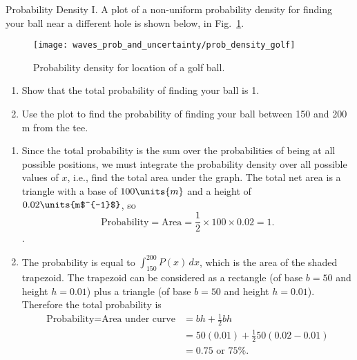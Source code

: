 \begin{example}{Probability Density I.}
A plot of a non-uniform probability density for finding your ball near
a different hole is shown below, in Fig.~\ref{fig:prob_density_golf}.

\begin{figure}[!h]
\begin{center}
\texttt{[image: waves\_prob\_and\_uncertainty/prob\_density\_golf]}
\end{center}
\caption{Probability density for location of a golf ball.}
\label{fig:prob_density_golf}
\end{figure}



\begin{enumerate}
\item Show that the total probability of finding your ball is 1.
\item Use the plot to find the probability of finding your ball
  between 150 and 200 m from the tee.
\end{enumerate}
\begin{solution}
\begin{enumerate}
\item Since the total probability is the sum over the probabilities
 of being at all possible positions, we must integrate the probability 
density over all possible values of $x$, i.e., find the total area under 
the graph.  The total net area is a triangle with 
a base of $100\units{m}$ and a height of $0.02\units{m$^{-1}$}$, so 
\begin{equation}
\text{Probability} = \text{Area} = {\textstyle\frac{1}{2}}\times 100
\times 0.02 = 1  .
\end{equation}.
\item The probability is equal to $\int_{150}^{200}P(x)\, dx$, which is the 
area of the shaded trapezoid.  The trapezoid can be considered as a rectangle 
(of base $b = 50$ and height $h = 0.01$) plus a triangle (of base $b = 50$ 
and height $h = 0.01$). Therefore the total probability is
\begin{align}
\text{Probability} = \text{Area under curve} %
  &= bh +  {\textstyle\frac{1}{2}b h}\nonumber \\
      &= 50 (0.01) + {\textstyle\frac{1}{2}}50 (0.02 - 0.01) \nonumber \\
                                 &= \boxed{0.75 \text{ or 75\%}.}
\end{align}
\end{enumerate}
\end{solution}
\end{example}

